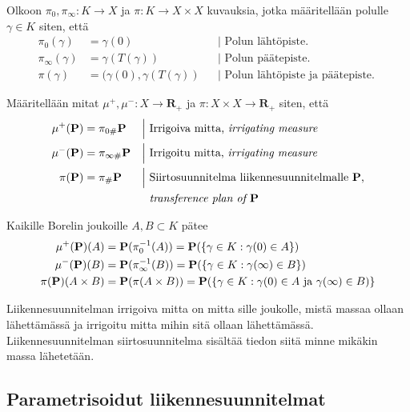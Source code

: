 \begin{definition}
    Olkoon $\pi_0, \pi_\infty: K\to X$ ja $\pi:K\to X \times X$ kuvauksia, jotka määritellään polulle $\gamma \in K$ siten, että 
    \begin{align*}
        \pi_0(\gamma) &= \gamma(0) &&\Big| \text{ Polun lähtöpiste. }\\
        \pi_\infty(\gamma) &= \gamma(T(\gamma)) &&\Big| \text{ Polun päätepiste. }\\
        \pi(\gamma) &= (\gamma(0), \gamma(T(\gamma)) &&\Big| \text{ Polun lähtöpiste ja päätepiste. }
    \end{align*}
\end{definition}

\begin{definition}
    Määritellään mitat $\mu^+, \mu^- : X \to \mathbf{R}_+$ ja $\pi: X\times X \to \mathbf{R}_+$ siten, että
    \begin{align*}
        \mu^+(\P) &= \pi_{0\#} \P  &&\Big| \text{ Irrigoiva mitta, \textit{irrigating measure} }\\
        \mu^-(\P) &= \pi_{\infty \#} \P  &&\Big| \text{ Irrigoitu mitta, \textit{irrigating measure} }\\
        \pi(\P) &= \pi_\# \P  &&\Big| \text{ Siirtosuunnitelma liikennesuunnitelmalle $\P$,}\\ 
        & &&\hphantom{\Big|} \text{ \textit{transference plan of $\P$}}
    \end{align*}
\end{definition}

\begin{remark}
    Kaikille Borelin joukoille $A, B \subset K$ pätee
    \begin{align*}
        \mu^+(\P)(A) &= \P(\pi_0^{-1}(A)) = \P(\{\gamma \in K : \gamma(0) \in A\}) \\
        \mu^-(\P)(B) &= \P(\pi_\infty^{-1}(B)) = \P(\{\gamma \in K : \gamma(\infty) \in B\}) \\
        \pi(\P)(A\times B) &= \P(\pi(A\times B)) = \P(\{\gamma \in K: \gamma(0) \in A\text{ ja } \gamma(\infty) \in B)\}
    \end{align*}
\end{remark}

Liikennesuunnitelman irrigoiva mitta on mitta sille joukolle, mistä massaa ollaan lähettämässä ja irrigoitu mitta mihin sitä ollaan lähettämässä. Liikennesuunnitelman siirtosuunnitelma sisältää tiedon siitä minne mikäkin massa lähetetään.

\subsection{Parametrisoidut liikennesuunnitelmat}
 
